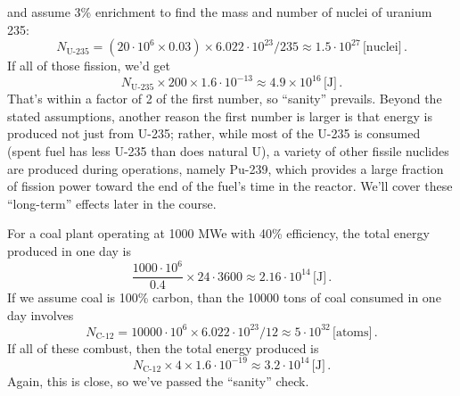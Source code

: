 {\begin{enumerate}[label=(\alph*)]
and assume 3\% enrichment to find the mass and number of nuclei of
uranium 235:
\[
  N_{\text{U-235}} = (20\cdot 10^6 \times 0.03) \times 6.022\cdot 10^{23} / 235 \approx 1.5\cdot 10^{27}\, \text{[nuclei]} \, .
\]
If all of those fission, we'd get
\[
  N_{\text{U-235}} \times 200 \times 1.6\cdot 10^{-13} \approx 4.9\times 10^{16} \, \text{[J]} \, .
\]
That's within a factor of 2 of the first number, so ``sanity'' prevails.
Beyond the stated assumptions, another reason the first number is larger
is that energy is produced not just from U-235; rather, while most of
the U-235 is consumed (spent fuel has less U-235 than does natural U), a
variety of other fissile nuclides are produced during operations, namely
Pu-239, which provides a large fraction of fission power toward the end
of the fuel's time in the reactor. We'll cover these ``long-term''
effects later in the course.

    For a coal plant operating at 1000 MWe with 40\% efficiency, the total
energy produced in one day is
\[
  \frac{1000 \cdot 10^6}{0.4} \times 24 \cdot 3600
  \approx 2.16\cdot 10^{14} \, \text{[J]} \, .
\]
If we assume coal is 100\% carbon, than the 10000 tons of coal consumed
in one day involves
\[
  N_{\text{C-12}} = 10000\cdot 10^6 \times  6.022\cdot 10^{23} / 12 \approx 5\cdot 10^{32} \, \text{[atoms]} \, .
\]
If all of these combust, then the total energy produced is
\[
  N_{\text{C-12}} \times 4 \times 1.6\cdot 10^{-19} \approx 3.2\cdot 10^{14} \, \text{[J]} \, .
\]
Again, this is close, so we've passed the ``sanity'' check.
\end{enumerate}

} %
\else
\fi
